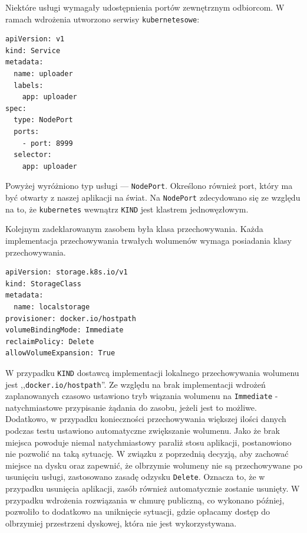 \documentclass[12pt,twoside]{article}
\begin{document}
Niektóre usługi wymagały udostępnienia portów zewnętrznym odbiorcom. W ramach wdrożenia utworzono serwisy \texttt{kubernetesowe}:
\begin{lstlisting}
apiVersion: v1
kind: Service
metadata:
  name: uploader
  labels:
    app: uploader
spec:
  type: NodePort
  ports:
    - port: 8999
  selector:
    app: uploader
\end{lstlisting}
Powyżej wyróżniono typ usługi — \texttt{NodePort}. Określono również port, który ma być otwarty z naszej aplikacji na świat. Na \texttt{NodePort} zdecydowano się ze względu na to, że \texttt{kubernetes} wewnątrz \texttt{KIND} jest klastrem jednowęzłowym.

Kolejnym zadeklarowanym zasobem była klasa przechowywania. Każda implementacja przechowywania trwałych wolumenów wymaga posiadania klasy przechowywania.

\begin{lstlisting}
apiVersion: storage.k8s.io/v1
kind: StorageClass
metadata:
  name: localstorage
provisioner: docker.io/hostpath
volumeBindingMode: Immediate
reclaimPolicy: Delete
allowVolumeExpansion: True
\end{lstlisting}

W przypadku \texttt{KIND} dostawcą implementacji lokalnego przechowywania wolumenu jest ,,\texttt{docker.io/hostpath}''. Ze względu na brak implementacji wdrożeń zaplanowanych czasowo ustawiono tryb wiązania wolumenu na \texttt{Immediate} -  natychmiastowe przypisanie żądania do zasobu, jeżeli jest to możliwe. Dodatkowo, w przypadku konieczności przechowywania większej ilości danych podczas testu ustawiono automatyczne zwiększanie wolumenu. Jako że brak miejsca powoduje niemal natychmiastowy paraliż stosu aplikacji, postanowiono nie pozwolić na taką sytuację. W związku z poprzednią decyzją, aby zachować miejsce na dysku oraz zapewnić, że olbrzymie wolumeny nie są przechowywane po usunięciu usługi, zastosowano zasadę odzysku \texttt{Delete}. Oznacza to, że w przypadku usunięcia aplikacji, zasób również automatycznie zostanie usunięty. W przypadku wdrożenia rozwiązania w chmurę publiczną, co wykonano później, pozwoliło to dodatkowo na uniknięcie sytuacji, gdzie opłacamy dostęp do olbrzymiej przestrzeni dyskowej, która nie jest wykorzystywana.
\end{document}
